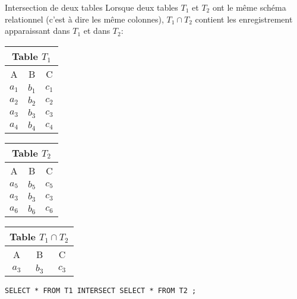 \documentclass[10pt]{beamer}
\begin{document}
\begin{frame}
	\begin{block}{Intersection de deux tables}
		Lorsque deux tables $T_1$ et $T_2$ ont \textcolor{BrickRed}{le même schéma relationnel} (c'est à dire les même colonnes), $T_1 \cap T_2$ contient les enregistrement apparaissant dans $T_1$ et dans $T_2$:
		\begin{center}
			\begin{tabular}{|c|c|c|}
				\multicolumn{3}{c}{\textcolor{Sepia}{Table $T_1$}} \\
				\hline
				\rowcolor{lightgray} A & B     & C                 \\
				\hline
				$a_1$                  & $b_1$ & $c_1$             \\
				\hline
				$a_2$                  & $b_2$ & $c_2$             \\
				\hline
				$a_3$                  & $b_3$ & $c_3$             \\
				\hline
				$a_4$                  & $b_4$ & $c_4$             \\
				\hline
			\end{tabular} \quad \quad
			\begin{tabular}{|c|c|c|}
				\multicolumn{3}{c}{\textcolor{Sepia}{Table $T_2$}} \\
				\hline
				\rowcolor{lightgray} A & B     & C                 \\
				\hline
				$a_5$                  & $b_5$ & $c_5$             \\
				\hline
				$a_3$                  & $b_3$ & $c_3$             \\
				\hline
				$a_6$                  & $b_6$ & $c_6$             \\
				\hline
			\end{tabular}
			\quad \quad
			\begin{tabular}{|c|c|c|}
				\multicolumn{3}{c}{\textcolor{Sepia}{Table $T_1 \cap T_2$}} \\
				\hline
				\rowcolor{lightgray} A & B     & C                          \\
				$a_3$                  & $b_3$ & $c_3$                      \\
				\hline
			\end{tabular}
		\end{center} \medskip
		\texttt{SELECT * FROM T1 INTERSECT SELECT * FROM T2 ;}
	\end{block}
\end{frame}
\end{document}
